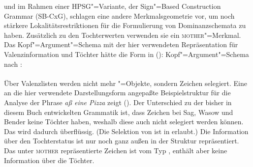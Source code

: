 \mbox{}\citet*[475--489]{SWB2003a} und \citet{Sag2007a,Sag2012a} im Rahmen einer HPSG"=Variante, der
Sign"=Based
Construction Grammar (SB-CxG), schlagen eine andere Merkmalsgeometrie vor, um noch
stärkere
Lokalitätsrestriktionen für die Formulierung von Dominanzschemata zu haben. Zusätzlich zu den Tochterwerten
verwenden sie ein \textsc{mother}"=Merkmal. Das Kopf"=Argument"=Schema mit der hier
verwendeten Repräsentation für Valenzinformation und Töchter hätte die Form in ():
\ea
Kopf"=Argument"=Schema nach \citet*[481]{SWB2003a}:\\
 \impl\\
\z
Über Valenzlisten werden nicht mehr "=Objekte, sondern Zeichen selegiert. Eine an die hier verwendete
Darstellungsform angepaßte Beispielstruktur für die Analyse der Phrase \emph{aß eine Pizza} zeigt
().
Der Unterschied zu der bisher in diesem Buch entwickelten Grammatik ist, 
dass Zeichen bei Sag, Wasow und Bender keine Töchter haben, weshalb
diese auch nicht selegiert werden können. Das \synsemm wird dadurch überflüssig. (Die Selektion von
\phon ist in  erlaubt.) Die Information
über den Tochterstatus ist nur noch ganz außen in der Struktur repräsentiert. Das unter
\textsc{mother} repräsentierte Zeichen ist vom Typ , enthält aber keine Information
über die Töchter. 
\ea
\label{feat-geom-swb}
